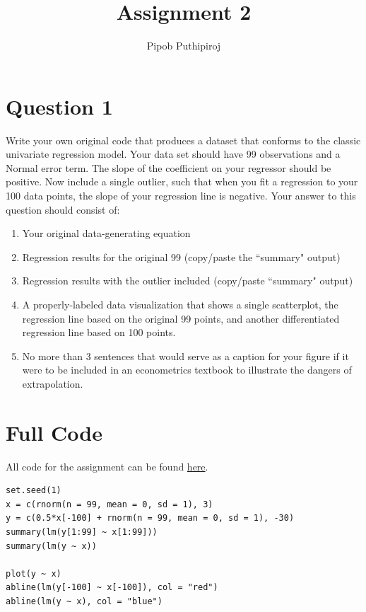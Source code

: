 \documentclass[11pt, oneside]{article}
\title{Assignment 2}
\author{Pipob Puthipiroj}
\begin{document}
\date{}
\maketitle

\section*{Question 1}
Write your own original code that produces a dataset that conforms to the classic univariate regression model. Your data set should have 99 observations and a Normal error term. The slope of the coefficient on your regressor should be positive. Now include a single outlier, such that when you fit a regression to your 100 data points, the slope of your regression line is negative.  Your answer to this question should consist of:
\begin{enumerate}[label=(\alph*)]
	\item Your original data-generating equation 
	\item Regression results for the original 99 (copy/paste the ``summary" output) 
	\item Regression results with the outlier included (copy/paste ``summary" output)
	\item A properly-labeled data visualization that shows a single scatterplot, the regression line based on the original 99 points, and another differentiated regression line based on 100 points.
	\item No more than 3 sentences that would serve as a caption for your figure if it were to be included in an econometrics textbook to illustrate the dangers of extrapolation.
	\end{enumerate}
	\section*{Full Code}
	All code for the assignment can be found \href{https://github.com/thetruejacob/CS112/blob/master/Assignment/Assignment 2.ipynb}{here}.
	\begin{verbatim}
set.seed(1)
x = c(rnorm(n = 99, mean = 0, sd = 1), 3)
y = c(0.5*x[-100] + rnorm(n = 99, mean = 0, sd = 1), -30)
summary(lm(y[1:99] ~ x[1:99]))
summary(lm(y ~ x))

plot(y ~ x)
abline(lm(y[-100] ~ x[-100]), col = "red")
abline(lm(y ~ x), col = "blue")
\end{verbatim}
\newpage
\end{document}
